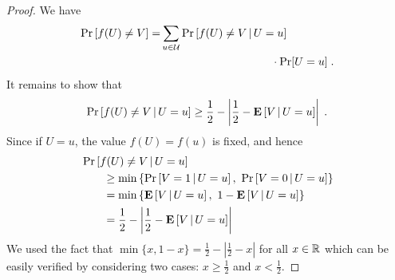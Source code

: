 \begin{proof}
We have
\begin{align*}
\Pr \left[ f(U) \neq V \right] =& \sum_{u \in \U} \Pr \left[ f(U) \neq V \, \middle| \, U = u \right] 
\\&\hspace{3.5cm}\cdot \Pr[U = u] \; .
\end{align*}
It remains to show that
$$
\Pr\left[ f(U) \neq V \, \middle| \, U = u \right]
\ge
\frac{1}{2} - \left| \frac{1}{2} -  \operatorname{\mathbf{E}} \left[V \, \middle| \, U = u \right] \right| \; .
$$
Since if  $U=u$, the value $f(U) = f(u)$ is fixed, and hence
\begin{align*}
& \Pr\left[ f(U) \neq V \, \middle| \, U = u \right] \\
& \qquad \ge \min\left\{ \Pr \left[ V = 1 \, \middle| \, U = u \right], \ \Pr \left[ V = 0 \, \middle| \, U = u \right] \right\} \\
& \qquad = \min\left\{ \operatorname{\mathbf{E}} \left[ V  \, \middle| \, U = u \right], \ 1 - \operatorname{\mathbf{E}} \left[ V \, \middle| \, U = u \right] \right\} \\
& \qquad = \frac{1}{2} - \left| \frac{1}{2} -  \operatorname{\mathbf{E}} \left[ V  \, \middle| \, U = u \right] \right|
\end{align*}
We used the fact that $\min\{x, 1 - x\} = \frac{1}{2} - \left| \frac{1}{2} - x \right|$ for all $x \in \mathbb{R}$
which can be easily verified by considering two cases: $x \ge \frac{1}{2}$ and $x < \frac{1}{2}$.
\end{proof}
